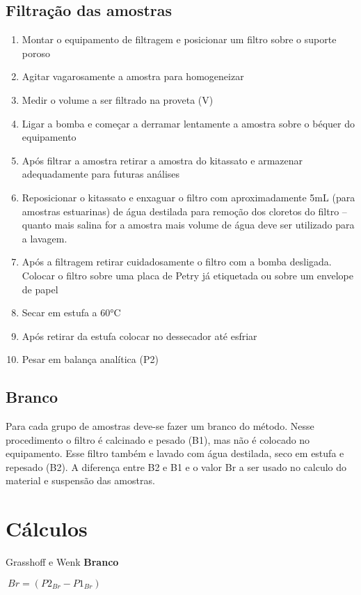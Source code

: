 \documentclass[a4paper,10pt]{SelfArx}
\begin{document}
\subsection{Filtração das amostras}
\begin{enumerate}[noitemsep]
\item Montar o equipamento de filtragem e posicionar um filtro sobre o suporte poroso
\item Agitar vagarosamente a amostra para homogeneizar
\item Medir o volume a ser filtrado na proveta (V)
\item Ligar a bomba e começar a derramar lentamente a amostra sobre o béquer do equipamento
\item Após filtrar a amostra retirar a amostra do kitassato e armazenar adequadamente para futuras análises
\item Reposicionar o kitassato e enxaguar o filtro com aproximadamente 5mL (para amostras estuarinas) de água destilada para remoção dos cloretos do filtro – quanto mais salina for a amostra mais volume de água deve ser utilizado para a lavagem.
\item Após a filtragem retirar cuidadosamente o filtro com a bomba desligada. Colocar o filtro sobre uma placa de Petry já etiquetada ou sobre um envelope de papel
\item Secar em estufa a 60°C
\item Após retirar da estufa colocar no dessecador até esfriar
\item Pesar em balança analítica (P2)

\end{enumerate}

\subsection{Branco}
Para cada grupo de amostras deve-se fazer um branco do método. Nesse procedimento o filtro é calcinado e pesado (B1), mas não é colocado no equipamento. Esse filtro também e lavado com água destilada, seco em estufa e repesado (B2). A diferença entre B2 e B1 e o valor Br a ser usado no calculo do material e suspensão das amostras.	

\section{Cálculos}

\indent 
Grasshoff e Wenk
\textbf {Branco}
\begin{center}
$\ Br = (P2_{Br}-P1_{Br})$
\end{center}
\vspace{0.15cm}
\end{document}
